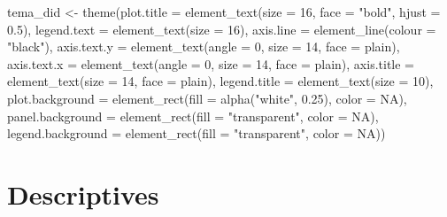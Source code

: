 \documentclass[
  letterpaper,
  DIV=11,
  numbers=noendperiod]{scrartcl}
\newenvironment{Shaded}{\begin{snugshade}}{\end{snugshade}}
\newcommand{\AttributeTok}[1]{\textcolor[rgb]{0.40,0.45,0.13}{#1}}
\newcommand{\ConstantTok}[1]{\textcolor[rgb]{0.56,0.35,0.01}{#1}}
\newcommand{\DecValTok}[1]{\textcolor[rgb]{0.68,0.00,0.00}{#1}}
\newcommand{\FloatTok}[1]{\textcolor[rgb]{0.68,0.00,0.00}{#1}}
\newcommand{\FunctionTok}[1]{\textcolor[rgb]{0.28,0.35,0.67}{#1}}
\newcommand{\NormalTok}[1]{\textcolor[rgb]{0.00,0.23,0.31}{#1}}
\newcommand{\OtherTok}[1]{\textcolor[rgb]{0.00,0.23,0.31}{#1}}
\newcommand{\StringTok}[1]{\textcolor[rgb]{0.13,0.47,0.30}{#1}}
\begin{document}
\begin{Shaded}
\begin{Highlighting}[]
\NormalTok{tema\_did }\OtherTok{\textless{}{-}} \FunctionTok{theme}\NormalTok{(}\AttributeTok{plot.title =} \FunctionTok{element\_text}\NormalTok{(}\AttributeTok{size =} \DecValTok{16}\NormalTok{, }\AttributeTok{face =} \StringTok{"bold"}\NormalTok{, }\AttributeTok{hjust =} \FloatTok{0.5}\NormalTok{),}
              \AttributeTok{legend.text =} \FunctionTok{element\_text}\NormalTok{(}\AttributeTok{size =} \DecValTok{16}\NormalTok{),}
              \AttributeTok{axis.line =} \FunctionTok{element\_line}\NormalTok{(}\AttributeTok{colour =} \StringTok{"black"}\NormalTok{),}
              \AttributeTok{axis.text.y =} \FunctionTok{element\_text}\NormalTok{(}\AttributeTok{angle =} \DecValTok{0}\NormalTok{, }\AttributeTok{size =} \DecValTok{14}\NormalTok{, }\AttributeTok{face =} \StringTok{\textquotesingle{}plain\textquotesingle{}}\NormalTok{),}
              \AttributeTok{axis.text.x =} \FunctionTok{element\_text}\NormalTok{(}\AttributeTok{angle =} \DecValTok{0}\NormalTok{, }\AttributeTok{size =} \DecValTok{14}\NormalTok{, }\AttributeTok{face =} \StringTok{\textquotesingle{}plain\textquotesingle{}}\NormalTok{),}
              \AttributeTok{axis.title =} \FunctionTok{element\_text}\NormalTok{(}\AttributeTok{size =} \DecValTok{14}\NormalTok{, }\AttributeTok{face =} \StringTok{\textquotesingle{}plain\textquotesingle{}}\NormalTok{),}
              \AttributeTok{legend.title =} \FunctionTok{element\_text}\NormalTok{(}\AttributeTok{size =} \DecValTok{10}\NormalTok{),}
              \AttributeTok{plot.background =} \FunctionTok{element\_rect}\NormalTok{(}\AttributeTok{fill =} \FunctionTok{alpha}\NormalTok{(}\StringTok{"white"}\NormalTok{, }\FloatTok{0.25}\NormalTok{), }
                                       \AttributeTok{color =} \ConstantTok{NA}\NormalTok{),}
              \AttributeTok{panel.background =} \FunctionTok{element\_rect}\NormalTok{(}\AttributeTok{fill =} \StringTok{"transparent"}\NormalTok{, }\AttributeTok{color =} \ConstantTok{NA}\NormalTok{),}
              \AttributeTok{legend.background =} \FunctionTok{element\_rect}\NormalTok{(}\AttributeTok{fill =} \StringTok{"transparent"}\NormalTok{, }\AttributeTok{color =} \ConstantTok{NA}\NormalTok{))}
\end{Highlighting}
\end{Shaded}

\section{Descriptives}\label{descriptives}
\end{document}
